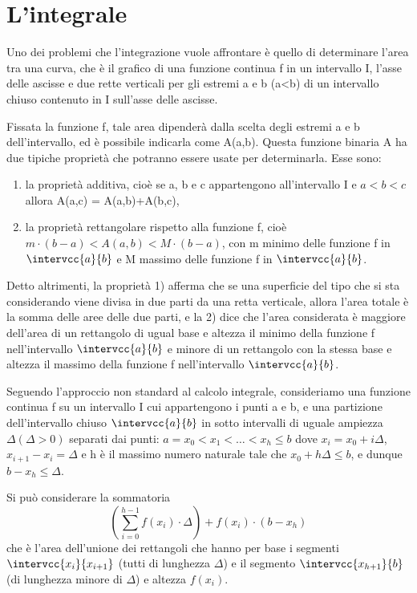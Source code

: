 ﻿%

\chapter{L'integrale}

Uno dei problemi che l'integrazione vuole affrontare è quello di determinare 
l'area tra una curva, che è il grafico di una funzione continua f in un 
intervallo I, l'asse delle ascisse e due rette verticali per gli estremi a e 
b (a<b) di un intervallo chiuso contenuto in I sull'asse delle ascisse.

Fissata la funzione f, tale area dipenderà dalla scelta degli estremi a e b 
dell'intervallo, ed è possibile indicarla come A(a,b). Questa funzione 
binaria A ha due tipiche proprietà che potranno essere usate per 
determinarla. Esse sono: 

\begin{enumerate}
 \item 
la proprietà additiva, cioè se a, b e c 
appartengono all'intervallo I e 
\(a < b < c\)
allora A(a,c) = A(a,b)+A(b,c),
 \item 
la proprietà rettangolare rispetto alla funzione f, 
cioè \(m\cdot(b-a) < A(a,b)< M\cdot(b-a)\), 
con m minimo delle funzione f in \(\intervcc{a}{b}\) e M massimo delle 
funzione f in \(\intervcc{a}{b}\).
\end{enumerate}
 
Detto altrimenti, la proprietà 1) afferma che se una superficie 
del tipo che si sta considerando viene divisa in due parti da una retta 
verticale, allora l'area totale è la somma delle aree delle due parti, e la 
2) dice che l'area considerata è maggiore dell'area di un rettangolo di ugual 
base e altezza il minimo della funzione f nell'intervallo \(\intervcc{a}{b}\) 
e minore di 
un rettangolo con la stessa base e altezza il massimo della funzione f 
nell'intervallo \(\intervcc{a}{b}\).

Seguendo l'approccio non standard al calcolo integrale, consideriamo una 
funzione continua f su un intervallo I cui appartengono i punti a e b, e una 
partizione dell'intervallo chiuso \(\intervcc{a}{b}\) in sotto intervalli di 
uguale 
ampiezza \(\Delta (\Delta>0)\) 
separati dai punti: \(a = x_0 < x_1 < … < x_h \le b\) 
dove \(x_i = x_0 +i \Delta\), \(x_{i+1} - x_i= \Delta\) e h è il massimo  
numero naturale tale che 
\(x_0 + h \Delta \le b\), e dunque \(b-x_h \le \Delta\).

Si può considerare la sommatoria
\[\left(\sum_{i=0}^{h-1} f(x_i)\cdot\Delta \right)+f(x_i)\cdot(b-x_h)\] 
che è l'area dell'unione dei rettangoli che 
hanno per base i segmenti \(\intervcc{x_i}{x_{i+1}}\) 
(tutti di lunghezza \(\Delta\)) e 
il segmento 
\(\intervcc{x_{h+1}}{b}\) (di lunghezza minore di \(\Delta\)) e altezza 
\(f(x_i)\). 

